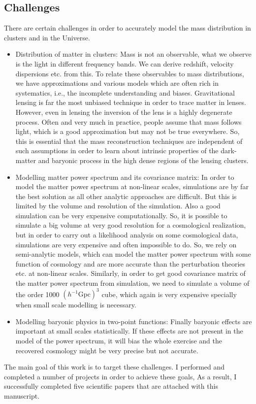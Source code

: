 \subsection{Challenges}

There are certain challenges in order to accurately model the mass distribution
in clusters and in the Universe. 

\begin{itemize}
	\item Distribution of matter in clusters: Mass is not an observable, what we 
			observe is the light in different frequency bands. We can derive 
			redshift, velocity dispersions etc. from this. To relate these observables
			to mass distributions, we have approximations and various models which
			are often rich in systematics, i.e., the incomplete understanding and 
			biases. Gravitational lensing is far the most unbiased technique in order
			to trace matter in lenses. However, even in lensing the inversion of the lens
			is a highly degenerate process. Often and very much in 
			practice, people assume that mass follows light, which is a good approximation
			but may not be true everywhere. So, this is essential that the 
			mass reconstruction techniques are independent of such assumptions in order
			to learn about intrinsic properties of the dark-matter and baryonic
			process in the high dense regions of the lensing clusters.

	\item Modelling matter power spectrum and its covariance matrix: In order to model
			the matter power spectrum at non-linear scales, simulations are by far the 
			best solution as all other analytic approaches are difficult. But this is limited
			by the volume and resolution of the simulation. Also a good simulation
			can be very expensive computationally. So, it is possible to simulate a big
			volume at very good resolution for a cosmological realization, but in order
			to carry out a likelihood analysis on some cosmological data, simulations are
			very expensive and often impossible to do. So, we rely on semi-analytic models, 
			which can model the matter power spectrum with some function of cosmology
			and are more accurate than the perturbation theories etc. at non-linear 
			scales. Similarly, in order to get good covariance matrix of the matter power
			spectrum from simulation, we need to simulate a volume of the order 
			1000 $(h^{-1} \mathrm{Gpc})^3$
			cube, which again is very expensive specially when small scale modelling 
			is necessary. 

	\item Modelling baryonic physics in two-point functions: Finally baryonic effects are 
			important at small scales statistically. If these effects are not present
			in the model of the power spectrum, it will bias the whole exercise and
			the recovered cosmology might be very precise but not accurate. 
\end{itemize}

The main goal of this work is to target these challenges. 
I performed and completed
a number of projects in order to achieve these goals,
As a result, I successfully completed five scientific papers
that are attached with this manuscript.
